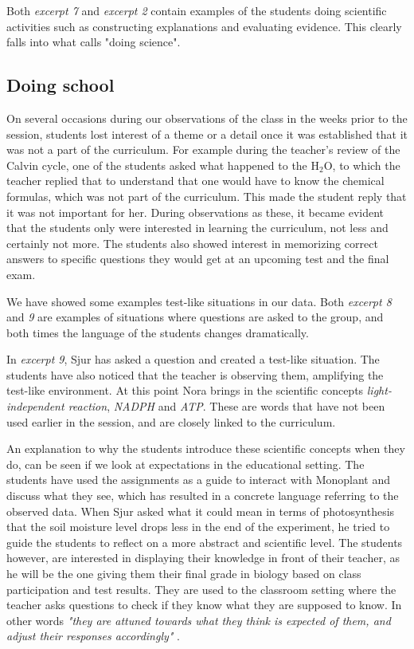 Both \emph{excerpt 7} and \emph{excerpt 2} contain examples of the students doing scientific activities such as constructing explanations and evaluating evidence. This clearly falls into what \citet{jimenez2000doing} calls "doing science".

\subsection{Doing school}
On several occasions during our observations of the class in the weeks prior to the session, students lost interest of a theme or a detail once it was established that it was not a part of the curriculum. For example during the teacher's review of the Calvin cycle, one of the students asked what happened to the $\text{H}_2\text{O}$, to which the teacher replied that to understand that one would have to know the chemical formulas, which was not part of the curriculum. This made the student reply that it was not important for her. During observations as these, it became evident that the students only were interested in learning the curriculum, not less and certainly not more. The students also showed interest in memorizing correct answers to specific questions they would get at an upcoming test and the final exam. 

We have showed some examples test-like situations in our data. Both \emph{excerpt 8} and \emph{9} are examples of situations where questions are asked to the group, and both times the language of the students changes dramatically. 

In \emph{excerpt 9}, Sjur has asked a question and created a test-like situation. The students have also noticed that the teacher is observing them, amplifying the test-like environment. At this point Nora brings in the scientific concepts \emph{light-independent reaction}, \emph{NADPH} and \emph{ATP}. These are words that have not been used earlier in the session, and are closely linked to the curriculum. 

An explanation to why the students introduce these scientific concepts when they do, can be seen if we look at expectations in the educational setting. The students have used the assignments as a guide to interact with Monoplant and discuss what they see, which has resulted in a concrete language referring to the observed data. When Sjur asked what it could mean in terms of photosynthesis that the soil moisture level drops less in the end of the experiment, he tried to guide the students to reflect on a more abstract and scientific level. The students however, are interested in displaying their knowledge in front of their teacher, as he will be the one giving them their final grade in biology based on class participation and test results. They are used to the classroom setting where the teacher asks questions to check if they know what they are supposed to know. In other words \emph{"they are attuned towards what they think is expected of them, and adjust their responses accordingly"} \citep{furberg2009socio}. 

